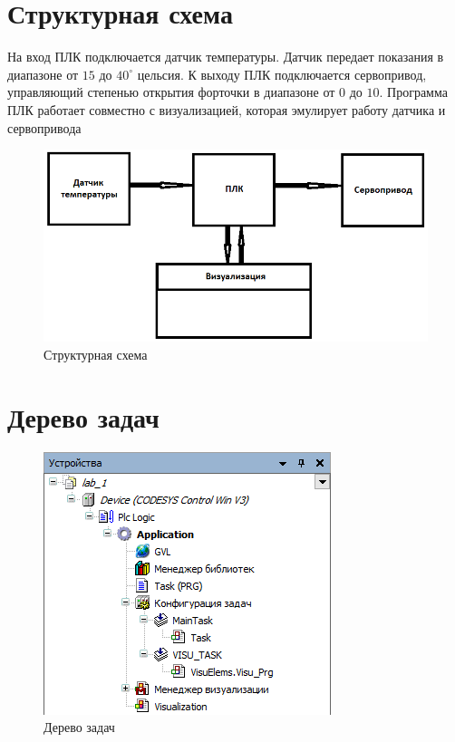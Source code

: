 \documentclass[a4paper, 16pt]{article}
\begin{document}
    \section{Структурная схема}
    \noindent На вход ПЛК подключается датчик температуры. Датчик передает показания в диапазоне от
    $15 \text{ до } 40^{\circ}$ цельсия. К выходу ПЛК подключается сервопривод, управляющий степенью
    открытия форточки в диапазоне от $0 \text{ до } 10$. Программа ПЛК работает совместно с визуализацией,
    которая эмулирует работу датчика и сервопривода


    \begin{figure}[!h]
        \centering
        \includegraphics[scale=0.7]{scheme.png}
        \captionsetup{skip=0pt}
        \caption{Структурная схема}
        \label{Рис:1}
    \end{figure}


    \section{Дерево задач}
    \begin{figure}[!h]
        \centering
        \includegraphics[scale=0.9]{tasks.png}
        \captionsetup{skip=0pt}
        \caption{Дерево задач}
        \label{Рис:2}
    \end{figure}
\end{document}

